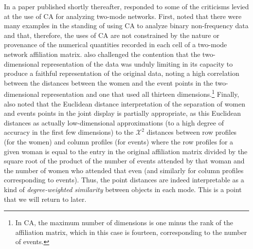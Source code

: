 \documentclass[a4paper,fleqn]{cas-sc}
\begin{document}
In a paper published shortly thereafter, \citet{roberts2000correspondence} responded to some of the criticisms \citet{borgatti1997network} levied at the use of CA for analyzing two-mode networks. First, \citet{roberts2000correspondence} noted that there were many examples in the standing of using CA to analyze binary non-frequency data and that, therefore, the uses of CA are not constrained by the nature or provenance of the numerical quantities recorded in each cell of a two-mode network affiliation matrix. \citet{roberts2000correspondence} also challenged the contention that the two-dimensional representation of the data was unduly limiting in its capacity to produce a faithful representation of the original data, noting a high correlation between the distances between the women and the event points in the two-dimensional representation and one that used all thirteen dimensions.\footnote{In CA, the maximum number of dimensions is one minus the rank of the affiliation matrix, which in this case is fourteen, corresponding to the number of events.} Finally, \citet{roberts2000correspondence} also noted that the Euclidean distance interpretation of the separation of women and events points in the joint display is partially appropriate, as this Euclidean distances as actually low-dimensional approximations (to a high degree of accuracy in the first few dimensions) to the $\mathcal{X}^2$ distances between row profiles (for the women) and column profiles (for events) where the row profiles for a given woman is equal to the entry in the original affiliation matrix divided by the square root of the product of the number of events attended by that woman and the number of women who attended that even (and similarly for column profiles corresponding to events). Thus, the point distances are indeed interpretable as a kind of \textit{degree-weighted similarity} between objects in each mode. This is a point that we will return to later.   
\end{document}
